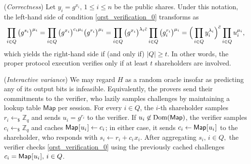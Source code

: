 \documentclass{iacrtrans}
\begin{document}
\begin{rem}\label{orst_correctness}
(\textit{Correctness})
Let $y_i = g ^ {x_i},\hspace{2pt} 1 \le i \le n$
be the public shares.
Under this notation,
the left-hand side of condition \eqref{orst_verification_0}
transforms as
\vspace{5pt}
\begin{equation*}
\prod_{i \in Q} \big(g ^ {s_i }\big) ^ {\mu_i} =
\prod_{i \in Q} \big(g ^ {x_i}\big) ^ {c_i \mu_i} \big(g ^ {r_i}\big) ^ {\mu_i} =
\prod_{i \in Q} \big(g ^ {x_i}\big) ^ {\lambda_i \bar{c}} \prod_{i \in Q} \big(g_i ^ {r_i}\big) ^ {\mu_i} =
\Big(\prod_{i \in Q} y_i ^ {\lambda_i}\Big) ^ {\bar{c}} \prod_{i \in Q} u_i ^ {\mu_i},
\vspace{5pt}
\end{equation*}
which yields the right-hand side if (and only if) $|Q| \ge t$.
In other words, the proper protocol execution verifies
only if at least $t$ shareholders are involved.
\end{rem}

\begin{rem}\label{orst_interactive}
(\textit{Interactive variance})
We may regard $H$ as
a random oracle insofar as predicting any of its output bits
is infeasible. Equivalently, the provers send their commitments
to the verifier, who lazily samples challenges
by maintaining a lookup table $\mathsf{Map}$ per session.
For every $i \in Q$, the $i$-th shareholder
samples $r_i \leftarrow_\$ \mathbb{Z}_q$
and sends
$u_i = g ^ {r_i}$ to the verifier.
If $u_i \not \in \textup{Dom}(\mathsf{Map})$,
the verifier samples
$c_i \leftarrow_\$ \mathbb{Z}_q$
and caches
$\mathsf{Map}\hspace{0.5pt}
[\hspace{0.5pt}u_i\hspace{0.5pt}]\leftarrow c_i$;
in either case, it sends %
$c_i \leftarrow \mathsf{Map}\hspace{0.5pt}
[\hspace{0.5pt}u_i\hspace{0.5pt}]$
to the shareholder, who responds with
$s_i \leftarrow r_i + c_i\hspace{1pt}x_i$.
After aggregating
$s_i,\hspace{2pt} i \in Q,$
the verifier checks
\eqref{orst_verification_0} using
the previously cached challenges
$c_i = \mathsf{Map}\hspace{0.5pt}
[\hspace{0.5pt}u_i\hspace{0.5pt}],\hspace{2pt} i \in Q$.
\end{rem}
\end{document}
